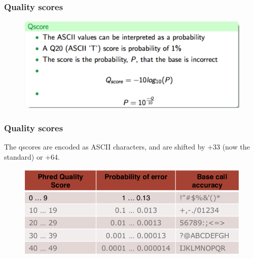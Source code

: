 \begin{frame}
\frametitle{Quality scores}

        \begin{figure}
                \includegraphics[width=\textwidth]{Pics/qscores.png}
        \end{figure}

\end{frame}


\begin{frame}
\frametitle{Quality scores}

	The qscores are encoded as ASCII characters, and are shifted by +33 (now the standard) or +64.

        \begin{figure}
                \includegraphics[width=\textwidth]{Pics/qscores_table.png}
        \end{figure}

\end{frame}


